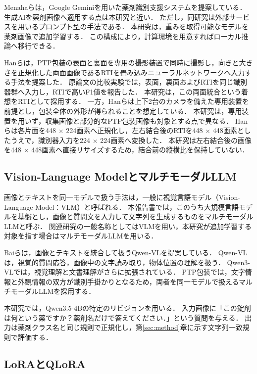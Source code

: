 \documentclass[uplatex,dvipdfmx]{jsarticle}
\begin{document}
Menahaらは，Google Geminiを用いた薬剤識別支援システムを提案している\cite{menaha2024gemini}．
生成AIを薬剤画像へ適用する点は本研究と近い．
ただし，同研究は外部サービスを用いるプロンプト型の手法である．
本研究は，重みを取得可能なモデルを薬剤画像で追加学習する．
この構成により，計算環境を用意すればローカル推論へ移行できる．

Hanらは，PTP包装の表面と裏面を専用の撮影装置で同時に撮影し，向きと大きさを正規化した両面画像であるRTIを畳み込みニューラルネットワークへ入力する手法を提案した\cite{han2021blister}．
原論文の比較実験では，表面，裏面およびRTIを同じ識別器群へ入力し，RTIで高いF1値を報告した．
本研究は，この両面統合という着想をRTIとして採用する．
一方，Hanらは上下2台のカメラを備えた専用装置を前提とし，包装全体の外形が得られることを想定している．
本研究は，専用装置を用いず，収集画像と部分的なPTP包装画像も対象とする点で異なる．
Hanらは各片面を448 $\times$ 224画素へ正規化し，左右結合後のRTIを448 $\times$ 448画素としたうえで，識別器入力を224 $\times$ 224画素へ変換した．
本研究は左右結合後の画像を448 $\times$ 448画素へ直接リサイズするため，結合前の縦横比を保持していない．

\subsection{Vision-Language Modelとマルチモーダル\mbox{LLM}}\label{sec:vlm}

画像とテキストを同一モデルで扱う手法は，一般に視覚言語モデル（Vision-Language Model：VLM）と呼ばれる．
本報告書では，このうち大規模言語モデルを基盤とし，画像と質問文を入力して文字列を生成するものをマルチモーダルLLMと呼ぶ．
関連研究の一般名称としてはVLMを用い，本研究が追加学習する対象を指す場合はマルチモーダルLLMを用いる．

Baiらは，画像とテキストを統合して扱うQwen-VLを提案している\cite{bai2023qwenvl}．
Qwen-VLは，視覚的質問応答，画像中の文字読み取り，物体位置の理解を扱う．
Qwen3-VLでは，視覚理解と文書理解がさらに拡張されている\cite{qwen3vl2025}．
PTP包装では，文字情報と外観情報の双方が識別手掛かりとなるため，両者を同一モデルで扱えるマルチモーダルLLMを採用する．

本研究では，Qwen3.5-4Bの特定のリビジョンを用いる\cite{qwen35model}．
入力画像に「この錠剤は何という薬ですか？薬剤名だけで答えてください．」という質問を与える．
出力は薬剤クラス名と同じ規則で正規化し，第\ref{sec:method}章に示す文字列一致規則で評価する．

\subsection{LoRAとQLoRA}
\end{document}
